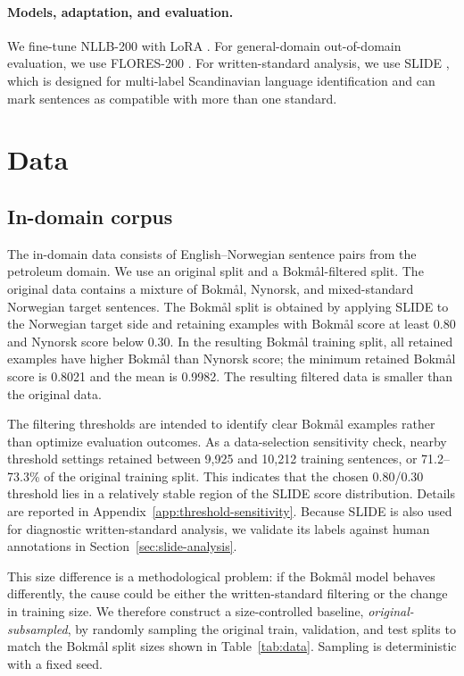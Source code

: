 \documentclass[11pt]{article}
\newcommand{\nb}{Bokm{\aa}l}
\newcommand{\nn}{Nynorsk}
\begin{document}
\paragraph{Models, adaptation, and evaluation.}
We fine-tune NLLB-200 \cite{nllbteam2024scaling} with LoRA \cite{hu2021lora}. For general-domain out-of-domain evaluation, we use FLORES-200 \cite{nllbteam2024scaling}. For written-standard analysis, we use SLIDE \cite{fedorova2025slide}, which is designed for multi-label Scandinavian language identification and can mark sentences as compatible with more than one standard.

\section{Data}

\subsection{In-domain corpus}

The in-domain data consists of English--Norwegian sentence pairs from the petroleum domain. We use an original split and a \nb{}-filtered split. The original data contains a mixture of \nb{}, \nn{}, and mixed-standard Norwegian target sentences. The \nb{} split is obtained by applying SLIDE to the Norwegian target side and retaining examples with \nb{} score at least 0.80 and \nn{} score below 0.30. In the resulting \nb{} training split, all retained examples have higher \nb{} than \nn{} score; the minimum retained \nb{} score is 0.8021 and the mean is 0.9982. The resulting filtered data is smaller than the original data.

The filtering thresholds are intended to identify clear \nb{} examples rather than optimize evaluation outcomes. As a data-selection sensitivity check, nearby threshold settings retained between 9,925 and 10,212 training sentences, or 71.2--73.3\% of the original training split. This indicates that the chosen 0.80/0.30 threshold lies in a relatively stable region of the SLIDE score distribution. Details are reported in Appendix~\ref{app:threshold-sensitivity}. Because SLIDE is also used for diagnostic written-standard analysis, we validate its labels against human annotations in Section~\ref{sec:slide-analysis}.

This size difference is a methodological problem: if the \nb{} model behaves differently, the cause could be either the written-standard filtering or the change in training size. We therefore construct a size-controlled baseline, \emph{original-subsampled}, by randomly sampling the original train, validation, and test splits to match the \nb{} split sizes shown in Table~\ref{tab:data}. Sampling is deterministic with a fixed seed.
\end{document}
